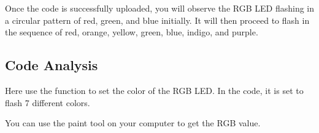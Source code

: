 \documentclass[a4paper,11pt,english]{sphinxmanual}
\begin{document}
\sphinxAtStartPar
Once the code is successfully uploaded, you will observe the RGB LED flashing in a circular pattern of red, green, and blue initially. It will then proceed to flash in the sequence of red, orange, yellow, green, blue, indigo, and purple.


\subsection{Code Analysis}
\label{\detokenize{Basic_Project/RGB_LED:code-analysis}}
\sphinxAtStartPar
{}

\sphinxAtStartPar
Here use the  function to set the color of the RGB LED. In the
code, it is set to flash 7 different colors.

\sphinxAtStartPar
You can use the paint tool on your computer to get the RGB value.
\end{document}
